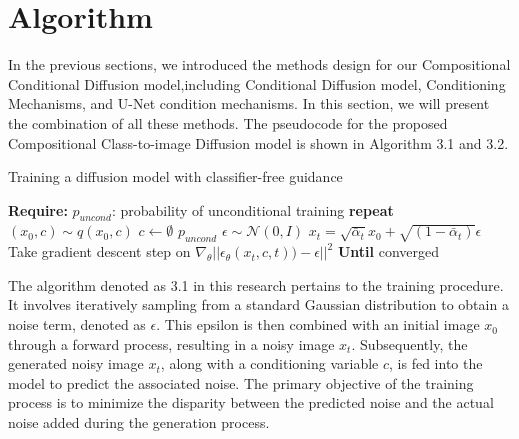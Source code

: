 \newpage
\section{Algorithm}
In the previous sections, we introduced the methods design for our Compositional Conditional Diffusion model,including Conditional Diffusion model, Conditioning Mechanisms, and U-Net condition mechanisms. In this section, we will present the combination of all these methods.
The pseudocode for the proposed Compositional Class-to-image Diffusion model is shown in Algorithm 3.1 and 3.2.

\begin{algorithm}[H]
\caption{Training a diffusion model with classifier-free guidance}
\label{alg:Training}
\begin{algorithmic}[1]
\Statex \hspace{-\algorithmicindent} \textbf{Require:} \(p_{uncond}\): probability of unconditional training
\State \textbf{repeat}
\State \hspace{1em} \((x_0, c) \sim q(x_0, c)\) 
\State \hspace{1em} \(c \leftarrow \emptyset \)  \(p_{uncond}\)
\State \hspace{1em} \(\epsilon \sim \mathcal{N} (0, I)\)
\State \hspace{1em} \(x_t = \sqrt{\bar\alpha_t}x_0 + \sqrt{(1 - \bar\alpha_{t})}\epsilon\)
\State \hspace{1em}Take gradient descent step on \(\nabla_{\theta}||\epsilon_{\theta}(x_t,c,t))-\epsilon||^2\)
\State \textbf{Until} converged
\end{algorithmic}
\end{algorithm}

The algorithm denoted as 3.1 in this research pertains to the training procedure. It involves iteratively sampling from a standard Gaussian distribution to obtain a noise term, denoted as \(\epsilon\). This epsilon is then combined with an initial image \(x_0\) through a forward process, resulting in a noisy image \(x_t\). Subsequently, the generated noisy image \(x_t\), along with a conditioning variable \(c\), is fed into the model to predict the associated noise. The primary objective of the training process is to minimize the disparity between the predicted noise and the actual noise added during the generation process. 

